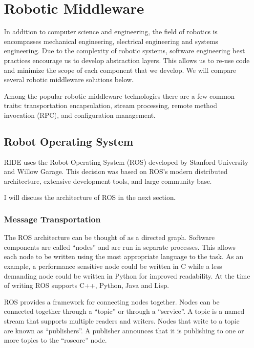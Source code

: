 \chapter{Robotic Middleware}

In addition to computer science and engineering, the field of robotics is encompasses mechanical engineering, electrical engineering and systems engineering. Due to the complexity of robotic systems, software engineering best practices encourage us to develop abstraction layers. This allows us to re-use code and minimize the scope of each component that we develop. We will compare several robotic middleware solutions below.

Among the popular robotic middleware technologies there are a few common traits: transportation encapsulation, stream processing, remote method invocation (RPC), and configuration management.


\section{Robot Operating System}
RIDE uses the Robot Operating System (ROS) developed by Stanford University and Willow Garage. This decision was based on ROS's modern distributed architecture, extensive development tools, and large community base.

I will discuss the architecture of ROS in the next section.


\subsection{Message Transportation}
The ROS architecture can be thought of as a directed graph. Software components are called ``nodes'' and are run in separate processes. This allows each node to be written using the most appropriate language to the task. As an example, a performance sensitive node could be written in C while a less demanding node could be written in Python for improved readability. At the time of writing ROS supports C++, Python, Java and Lisp.

ROS provides a framework for connecting nodes together. Nodes can be connected together through a ``topic'' or through a ``service''. A topic is a named stream that supports multiple readers and writers. Nodes that write to a topic are known as ``publishers''. A publisher announces that it is publishing to one or more topics to the ``roscore'' node. 

